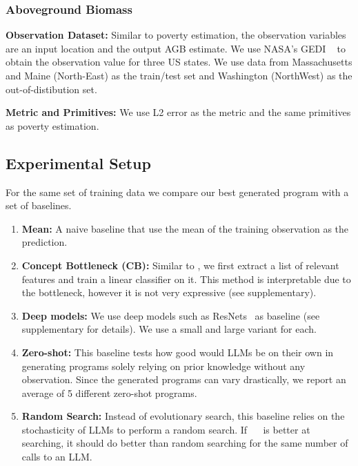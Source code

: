 \subsubsection{Aboveground Biomass}

\textbf{Observation Dataset:}  
Similar to poverty estimation, the observation variables are an input location and the output AGB estimate. We use NASA's GEDI ~\citep{dubayah2020gedi} to obtain the observation value for three US states. 
We use data from Massachusetts and Maine (North-East) as the train/test set and Washington (NorthWest) as the out-of-distibution set.

\textbf{Metric and Primitives:} We use L2 error as the metric and the same primitives as poverty estimation.



\subsection{Experimental Setup}
For the same set of training data we compare our best generated program with a set of baselines. 
\begin{enumerate}
    \item \textbf{Mean:} A naive baseline that use the mean of the training observation as the prediction.
    \item \textbf{Concept Bottleneck (CB):} Similar to \cite{koh20concept,yang2023language,oikarinen2023label}, we first extract a list of relevant features and train a linear classifier on it. 
    This method is interpretable due to the bottleneck, however it is not very expressive (see supplementary).
     

    \item \textbf{Deep models:} We use deep models such as ResNets~\cite{he2016resnet} as baseline (see supplementary for details). We use a small and large variant for each.
    
    \item \textbf{Zero-shot:} This baseline tests how good would LLMs be on their own in generating programs solely relying on prior knowledge without any observation. Since the generated programs can vary drastically, we report an average of 5 different zero-shot programs.

    \item \textbf{Random Search:} Instead of evolutionary search, this baseline relies on the stochasticity of LLMs to perform a random search. If ~\disciple~ is better at searching, it should do better than random searching for the same number of calls to an LLM.
\end{enumerate}

